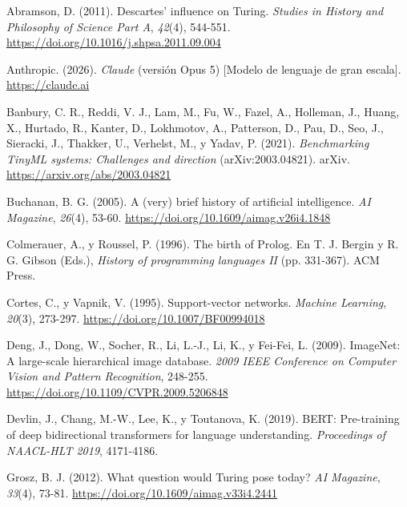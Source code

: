 \documentclass[12pt,letterpaper,oneside]{article}
\newenvironment{referencias}
  {\begin{list}{}{%
      \setlength{\leftmargin}{1.25cm}%
      \setlength{\itemindent}{-1.25cm}%
      \setlength{\itemsep}{0.6em}%
      \setlength{\parsep}{0pt}}%
   \setstretch{1.1}}
  {\end{list}}
\begin{document}
\begin{referencias}

\item Abramson, D. (2011). Descartes' influence on Turing. \textit{Studies in History and Philosophy of Science Part A}, \textit{42}(4), 544-551. \url{https://doi.org/10.1016/j.shpsa.2011.09.004}

\item Anthropic. (2026). \textit{Claude} (versión Opus 5) [Modelo de lenguaje de gran escala]. \url{https://claude.ai}

\item Banbury, C. R., Reddi, V. J., Lam, M., Fu, W., Fazel, A., Holleman, J., Huang, X., Hurtado, R., Kanter, D., Lokhmotov, A., Patterson, D., Pau, D., Seo, J., Sieracki, J., Thakker, U., Verhelst, M., y Yadav, P. (2021). \textit{Benchmarking TinyML systems: Challenges and direction} (arXiv:2003.04821). arXiv. \url{https://arxiv.org/abs/2003.04821}

\item Buchanan, B. G. (2005). A (very) brief history of artificial intelligence. \textit{AI Magazine}, \textit{26}(4), 53-60. \url{https://doi.org/10.1609/aimag.v26i4.1848}

\item Colmerauer, A., y Roussel, P. (1996). The birth of Prolog. En T. J. Bergin y R. G. Gibson (Eds.), \textit{History of programming languages II} (pp. 331-367). ACM Press.

\item Cortes, C., y Vapnik, V. (1995). Support-vector networks. \textit{Machine Learning}, \textit{20}(3), 273-297. \url{https://doi.org/10.1007/BF00994018}

\item Deng, J., Dong, W., Socher, R., Li, L.-J., Li, K., y Fei-Fei, L. (2009). ImageNet: A large-scale hierarchical image database. \textit{2009 IEEE Conference on Computer Vision and Pattern Recognition}, 248-255. \url{https://doi.org/10.1109/CVPR.2009.5206848}

\item Devlin, J., Chang, M.-W., Lee, K., y Toutanova, K. (2019). BERT: Pre-training of deep bidirectional transformers for language understanding. \textit{Proceedings of NAACL-HLT 2019}, 4171-4186.

\item Grosz, B. J. (2012). What question would Turing pose today? \textit{AI Magazine}, \textit{33}(4), 73-81. \url{https://doi.org/10.1609/aimag.v33i4.2441}


\end{referencias}
\end{document}
